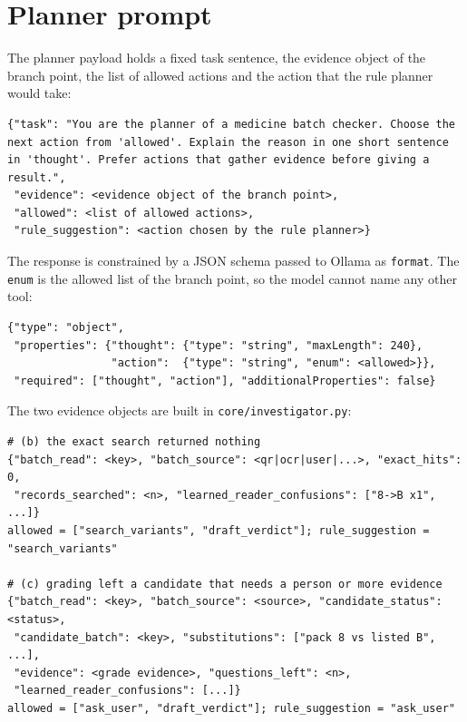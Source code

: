 \section{Planner prompt}
\label{sec:app-prompts-planner}

The planner payload holds a fixed task sentence, the evidence object of the branch point, the list of allowed actions and the action that the rule planner would take:
\begin{lstlisting}[language={},numbers=none,caption={Planner payload (\texttt{plan\_decision})},label={lst:app-planner}]
{"task": "You are the planner of a medicine batch checker. Choose the next action from 'allowed'. Explain the reason in one short sentence in 'thought'. Prefer actions that gather evidence before giving a result.",
 "evidence": <evidence object of the branch point>,
 "allowed": <list of allowed actions>,
 "rule_suggestion": <action chosen by the rule planner>}
\end{lstlisting}

The response is constrained by a JSON schema passed to Ollama as \texttt{format}. The \texttt{enum} is the allowed list of the branch point, so the model cannot name any other tool:
\begin{lstlisting}[language={},numbers=none,caption={Response schema of the planner call},label={lst:app-schema}]
{"type": "object",
 "properties": {"thought": {"type": "string", "maxLength": 240},
                "action":  {"type": "string", "enum": <allowed>}},
 "required": ["thought", "action"], "additionalProperties": false}
\end{lstlisting}

The two evidence objects are built in \texttt{core/investigator.py}:
\begin{lstlisting}[language={},numbers=none,caption={Evidence objects at branch points (b) and (c)},label={lst:app-evidence}]
# (b) the exact search returned nothing
{"batch_read": <key>, "batch_source": <qr|ocr|user|...>, "exact_hits": 0,
 "records_searched": <n>, "learned_reader_confusions": ["8->B x1", ...]}
allowed = ["search_variants", "draft_verdict"]; rule_suggestion = "search_variants"

# (c) grading left a candidate that needs a person or more evidence
{"batch_read": <key>, "batch_source": <source>, "candidate_status": <status>,
 "candidate_batch": <key>, "substitutions": ["pack 8 vs listed B", ...],
 "evidence": <grade evidence>, "questions_left": <n>,
 "learned_reader_confusions": [...]}
allowed = ["ask_user", "draft_verdict"]; rule_suggestion = "ask_user"
\end{lstlisting}

